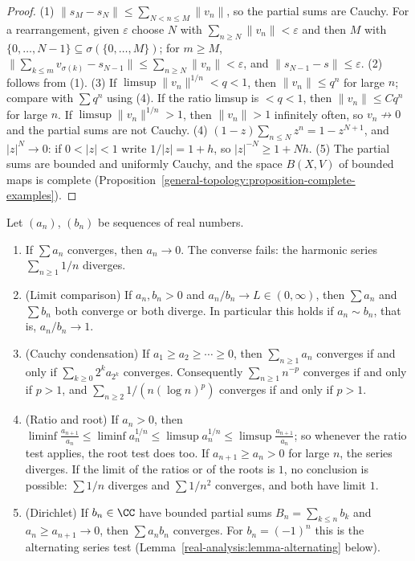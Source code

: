\begin{proof}
(1) $\|s_M - s_N\| \leq \sum_{N < n \leq M}\|v_n\|$, so the partial sums are Cauchy. For a rearrangement, given $\varepsilon$ choose $N$ with $\sum_{n \geq N}\|v_n\| < \varepsilon$ and then $M$
with $\{0, \ldots, N-1\} \subseteq \sigma(\{0, \ldots, M\})$; for $m \geq M$, $\|\sum_{k \leq m}v_{\sigma(k)} - s_{N-1}\| \leq \sum_{n \geq N}\|v_n\| < \varepsilon$, and $\|s_{N-1} - s\| \leq \varepsilon$.
(2) follows from (1). (3) If $\limsup\|v_n\|^{1/n} < q < 1$, then $\|v_n\| \leq q^n$ for large $n$; compare with $\sum q^n$ using (4). If the ratio limsup is $< q < 1$, then
$\|v_n\| \leq Cq^n$ for large $n$. If $\limsup\|v_n\|^{1/n} > 1$, then $\|v_n\| > 1$ infinitely often, so $v_n \not\to 0$ and the partial sums are not Cauchy. (4)
$(1 - z)\sum_{n \leq N}z^n = 1 - z^{N+1}$, and $|z|^N \to 0$: if $0 < |z| < 1$ write $1/|z| = 1 + h$, so $|z|^{-N} \geq 1 + Nh$. (5) The partial sums are bounded and uniformly Cauchy, and the space
$B(X, V)$ of bounded maps is complete (Proposition~\ref{general-topology:proposition-complete-examples}).
\end{proof}

\begin{proposition}\label{real-analysis:proposition-series-tests}
Let $(a_n)$, $(b_n)$ be sequences of real numbers.
\begin{enumerate}
\item If $\sum a_n$ converges, then $a_n \to 0$. The converse fails: the harmonic series $\sum_{n \geq 1}1/n$ diverges.
\item (Limit comparison) If $a_n, b_n > 0$ and $a_n/b_n \to L \in (0, \infty)$, then $\sum a_n$ and $\sum b_n$ both converge or both diverge. In particular this holds if $a_n \sim b_n$, that is,
$a_n/b_n \to 1$.
\item (Cauchy condensation) If $a_1 \geq a_2 \geq \cdots \geq 0$, then $\sum_{n \geq 1}a_n$ converges if and only if $\sum_{k \geq 0}2^ka_{2^k}$ converges. Consequently $\sum_{n \geq 1}n^{-p}$
converges if and only if $p > 1$, and $\sum_{n \geq 2}1/(n(\log n)^p)$ converges if and only if $p > 1$.
\item (Ratio and root) If $a_n > 0$, then $\liminf\frac{a_{n+1}}{a_n} \leq \liminf a_n^{1/n} \leq \limsup a_n^{1/n} \leq \limsup\frac{a_{n+1}}{a_n}$; so whenever the ratio test applies, the root test
does too. If $a_{n+1} \geq a_n > 0$ for large $n$, the series diverges. If the limit of the ratios or of the roots is $1$, no conclusion is possible: $\sum 1/n$ diverges and $\sum 1/n^2$
converges, and both have limit $1$.
\item (Dirichlet) If $b_n \in \CC$ have bounded partial sums $B_n = \sum_{k \leq n}b_k$ and $a_n \geq a_{n+1} \to 0$, then $\sum a_nb_n$ converges. For $b_n = (-1)^n$ this is the alternating
series test (Lemma~\ref{real-analysis:lemma-alternating} below).
\end{enumerate}
\end{proposition}

